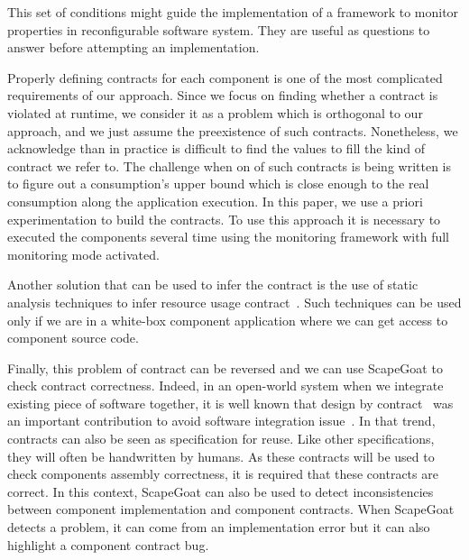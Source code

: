 This set of conditions might guide the implementation of a framework to monitor properties in reconfigurable software system.
They are useful as questions to answer before attempting an implementation. 


Properly defining contracts for each component is one of the most complicated requirements of our approach.
Since we focus on finding whether a contract is violated at runtime, we consider it as a problem which is orthogonal to our approach, and we just assume the preexistence of such contracts.
Nonetheless, we acknowledge than in practice is difficult to find the values to fill the kind of contract we refer to. The challenge when on of such contracts is being written is to figure out a consumption's upper bound which is close enough to the real consumption along the application execution. In this paper, we use a priori experimentation to build the contracts.
To use this approach it is necessary to executed the components several time using the monitoring framework with full monitoring mode activated.  


Another solution that can be used to infer the contract is the use of static analysis techniques to infer resource usage contract~\cite{Pasquale93,hofmann2003static,jost2010static}. Such techniques can be used only if we are in a white-box component application where we can get access to component source code.  

Finally, this problem of contract can be reversed and we can use ScapeGoat to check contract correctness. Indeed, in an open-world system when we integrate existing piece of software together, it is well known that design by contract~\cite{meyer1992applying} was an important contribution to avoid software integration issue~\cite{jazequel1997design}. In that trend, contracts can also be seen as specification for reuse. Like other specifications, they will often be handwritten by humans. As these contracts will be used to check components assembly correctness, it is required that these contracts are correct. In this context, ScapeGoat can also be used to detect inconsistencies between component implementation and component contracts. When ScapeGoat detects a problem, it can come from an implementation error but it can also highlight a component contract bug. 


